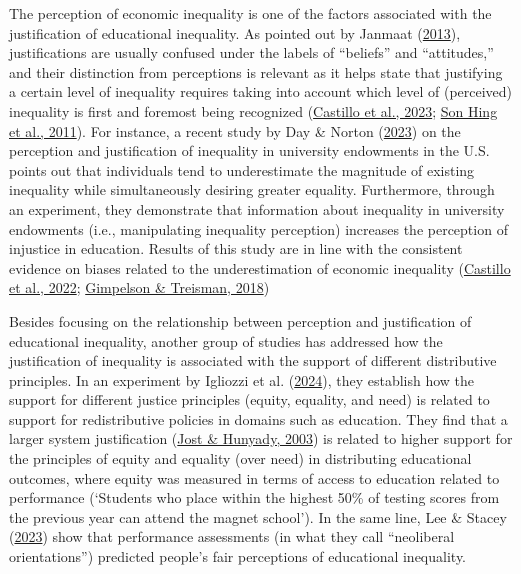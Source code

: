 \documentclass[
  12pt,
  a4paper,
]{article}
\begin{document}
The perception of economic inequality is one of the factors associated
with the justification of educational inequality. As pointed out by
Janmaat
(\protect\hyperlink{ref-janmaatSubjectiveInequalityReview2013}{2013}),
justifications are usually confused under the labels of ``beliefs'' and
``attitudes,'' and their distinction from perceptions is relevant as it
helps state that justifying a certain level of inequality requires
taking into account which level of (perceived) inequality is first and
foremost being recognized
(\protect\hyperlink{ref-castillo_multidimensional_2023}{Castillo et al.,
2023}; \protect\hyperlink{ref-sonhing_merit_2011}{Son Hing et al.,
2011}). For instance, a recent study by Day \& Norton
(\protect\hyperlink{ref-dayPerceivedIdealInequality2023}{2023}) on the
perception and justification of inequality in university endowments in
the U.S. points out that individuals tend to underestimate the magnitude
of existing inequality while simultaneously desiring greater equality.
Furthermore, through an experiment, they demonstrate that information
about inequality in university endowments (i.e., manipulating inequality
perception) increases the perception of injustice in education. Results
of this study are in line with the consistent evidence on biases related
to the underestimation of economic inequality
(\protect\hyperlink{ref-castillo_perception_2022}{Castillo et al.,
2022}; \protect\hyperlink{ref-gimpelson_misperceiving_2018}{Gimpelson \&
Treisman, 2018})

Besides focusing on the relationship between perception and
justification of educational inequality, another group of studies has
addressed how the justification of inequality is associated with the
support of different distributive principles. In an experiment by
Igliozzi et al.
(\protect\hyperlink{ref-igliozziFairShareEffects2024}{2024}), they
establish how the support for different justice principles (equity,
equality, and need) is related to support for redistributive policies in
domains such as education. They find that a larger system justification
(\protect\hyperlink{ref-jost_psychology_2003}{Jost \& Hunyady, 2003}) is
related to higher support for the principles of equity and equality
(over need) in distributing educational outcomes, where equity was
measured in terms of access to education related to performance
(`Students who place within the highest 50\% of testing scores from the
previous year can attend the magnet school'). In the same line, Lee \&
Stacey
(\protect\hyperlink{ref-leeFairnessPerceptionsEducational2023}{2023})
show that performance assessments (in what they call ``neoliberal
orientations'') predicted people's fair perceptions of educational
inequality.
\end{document}
